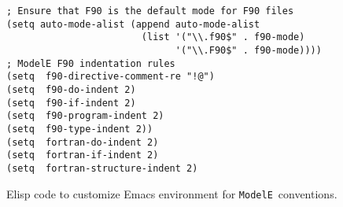 \documentclass{article}
\newcommand{\ModelE}{{\tt ModelE}}
\begin{document}
\begin{figure}[h]
\begin{boxedminipage}[t]{4.8in}
\begin{verbatim}
; Ensure that F90 is the default mode for F90 files
(setq auto-mode-alist (append auto-mode-alist 
                        (list '("\\.f90$" . f90-mode) 
                              '("\\.F90$" . f90-mode))))
; ModelE F90 indentation rules
(setq  f90-directive-comment-re "!@")
(setq  f90-do-indent 2) 
(setq  f90-if-indent 2) 
(setq  f90-program-indent 2)
(setq  f90-type-indent 2)) 
(setq  fortran-do-indent 2)
(setq  fortran-if-indent 2)
(setq  fortran-structure-indent 2)
\end{verbatim}
\end{boxedminipage}
\caption{Elisp code to customize Emacs environment for \ModelE~conventions.}
\label{elisp}
\end{figure}
\end{document}
